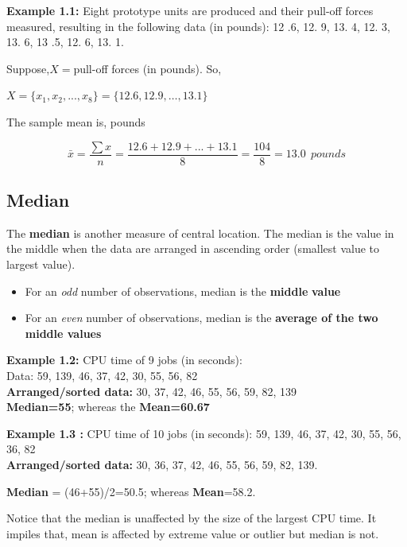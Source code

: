 \documentclass[
  11pt,
  letterpaper,
  DIV=11,
  numbers=noendperiod]{scrreprt}
\begin{document}
\textbf{Example 1.1:} Eight prototype units are produced and their
pull-off forces measured, resulting in the following data (in pounds):
12 .6, 12. 9, 13. 4, 12. 3, 13. 6, 13 .5, 12. 6, 13. 1.

Suppose,\(X=\)pull-off forces (in pounds). So,

\(X=\{x_1,x_2,...,x_8\}=\{12.6,12.9,…,13.1\}\)

The sample mean is, pounds

\[\bar x=\frac{\sum x}{n}=\frac{12.6+12.9+...+13.1}{8}=\frac{104}{8}=13.0 \ \ pounds\]

\subsection{Median}\label{median}

The \textbf{median} is another measure of central location. The median
is the value in the middle when the data are arranged in ascending order
(smallest value to largest value).

\begin{itemize}
\item
  For an \emph{odd} number of observations, median is the
  \textbf{middle} \textbf{value}
\item
  For an \emph{even} number of observations, median is the
  \textbf{average of the two middle values}
\end{itemize}

\textbf{Example 1.2:} CPU time of 9 jobs (in seconds):\\
Data: 59, 139, 46, 37, 42, 30, 55, 56, 82\\
\textbf{Arranged/sorted data:} 30, 37, 42, 46, 55, 56, 59, 82, 139\\
\textbf{Median=55}; whereas the \textbf{Mean=60.67}

\textbf{Example 1.3 :} CPU time of 10 jobs (in seconds): 59, 139, 46,
37, 42, 30, 55, 56, 36, 82\\
\textbf{Arranged/sorted data:} 30, 36, 37, 42, 46, 55, 56, 59, 82, 139.

\textbf{Median} = (46+55)/2=50.5; whereas \textbf{Mean}=58.2.

\begin{tcolorbox}[enhanced jigsaw, bottomrule=.15mm, toprule=.15mm, title=\textcolor{quarto-callout-note-color}{\faInfo}\hspace{0.5em}{Note}, bottomtitle=1mm, colframe=quarto-callout-note-color-frame, coltitle=black, rightrule=.15mm, toptitle=1mm, colbacktitle=quarto-callout-note-color!10!white, titlerule=0mm, breakable, arc=.35mm, leftrule=.75mm, opacitybacktitle=0.6, opacityback=0, colback=white, left=2mm]

Notice that the median is unaffected by the size of the largest CPU
time. It impiles that, mean is affected by extreme value or outlier but
median is not.

\end{tcolorbox}
\end{document}
